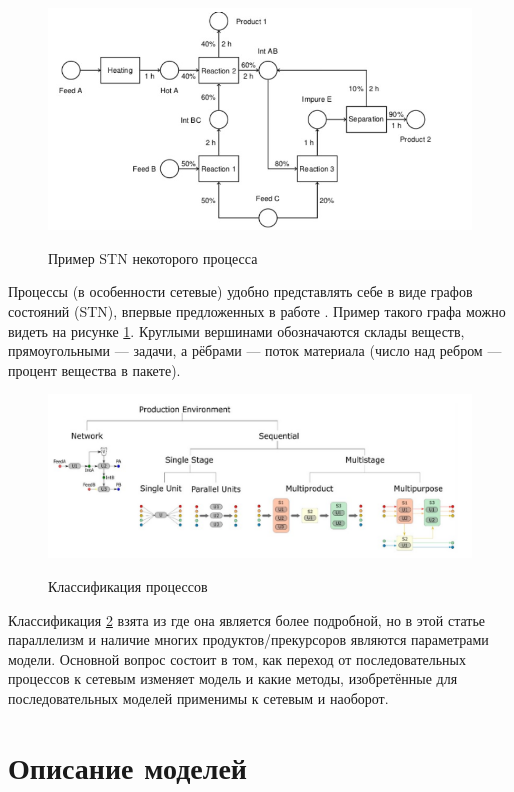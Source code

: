 \documentclass[12pt, twoside]{article}
\theoremstyle{definition}
\begin{document}
\begin{figure}[h]
\caption{Пример STN некоторого процесса}
\centering
\includegraphics[width=1.0\textwidth]{пример процесса}
\label{fig:stn_exmp}
\end{figure}

Процессы (в особенности сетевые) удобно представлять себе в виде графов состояний (STN), впервые предложенных в работе \cite{stnoriginal}. Пример такого графа можно видеть на рисунке \ref{fig:stn_exmp}. Круглыми вершинами обозначаются склады веществ, прямоугольными --- задачи, а рёбрами --- поток материала (число над ребром --- процент вещества в пакете).

\begin{figure}[h]
\caption{Классификация процессов}
\centering
\includegraphics[width=1.0\textwidth]{классификация процессов}
\label{fig:clas_proc}
\end{figure}

Классификация \ref{fig:clas_proc} взята из \cite{reallife} где она является более подробной, но в этой статье параллелизм и наличие многих продуктов/прекурсоров являются параметрами модели. Основной вопрос состоит в том, как переход от последовательных процессов к сетевым изменяет модель и какие методы, изобретённые для последовательных моделей применимы к сетевым и наоборот. 

\section{Описание моделей}
\end{document}
